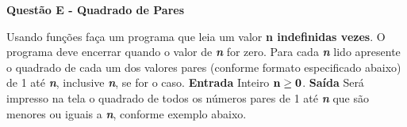 \documentclass[a4paper, 12pt]{article}
\begin{document}
\newpage %
\begin{center}
\textbf{{\Large Questão E - Quadrado de Pares}}
\end{center}
\vspace{5pt}
Usando funções faça um programa que leia um valor \textbf{n indefinidas vezes}. O
programa deve encerrar quando o valor de \textbf{\textit{n}} for zero. Para cada \textbf{\textit{n}} lido apresente o quadrado de cada um dos valores pares (conforme formato especificado
abaixo) de 1 até \textbf{\textit{n}}, inclusive \textbf{\textit{n}}, se for o caso.
\newline \newline
\textbf{{\large Entrada}} \newline
Inteiro $\textrm{\textbf{n}} \geq \textrm{\textbf{0}}$.
\newline \newline
\textbf{{\large Saída}} \newline
Será impresso na tela o quadrado de todos os números pares de 1 até \textbf{\textit{n}} que são menores ou iguais a \textbf{\textit{n}}, conforme exemplo abaixo.
\newline
\end{document}
